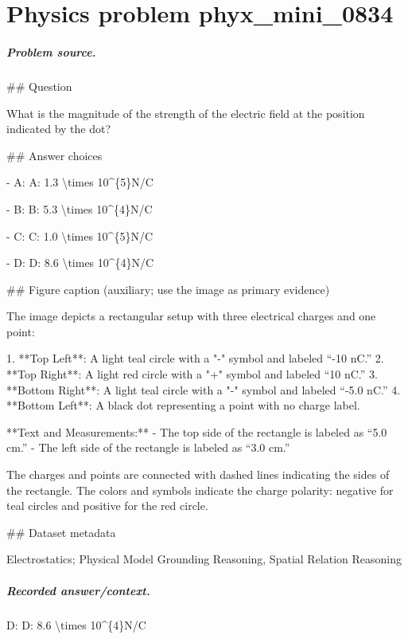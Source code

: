 
\chapter{Physics problem phyx\_mini\_0834}
\label{ch:PhyXMiniProblems_problem_phyx_mini_0834}

\paragraph{Problem source.}
\#\# Question

What is the magnitude of the strength of the electric field at the position indicated by the dot?

\#\# Answer choices

- A: A: 1.3 \textbackslash{}times 10\textasciicircum{}\{5\}N/C

- B: B: 5.3 \textbackslash{}times 10\textasciicircum{}\{4\}N/C

- C: C: 1.0 \textbackslash{}times 10\textasciicircum{}\{5\}N/C

- D: D: 8.6 \textbackslash{}times 10\textasciicircum{}\{4\}N/C

\#\# Figure caption (auxiliary; use the image as primary evidence)

The image depicts a rectangular setup with three electrical charges and one point:

1. **Top Left**: A light teal circle with a "-" symbol and labeled “-10 nC.”
2. **Top Right**: A light red circle with a "+" symbol and labeled “10 nC.”
3. **Bottom Right**: A light teal circle with a "-" symbol and labeled “-5.0 nC.”
4. **Bottom Left**: A black dot representing a point with no charge label.

**Text and Measurements:**
- The top side of the rectangle is labeled as “5.0 cm.”
- The left side of the rectangle is labeled as “3.0 cm.”

The charges and points are connected with dashed lines indicating the sides of the rectangle. The colors and symbols indicate the charge polarity: negative for teal circles and positive for the red circle.

\#\# Dataset metadata

Electrostatics; Physical Model Grounding Reasoning, Spatial Relation Reasoning

\paragraph{Recorded answer/context.}
D: D: 8.6 \textbackslash{}times 10\textasciicircum{}\{4\}N/C

